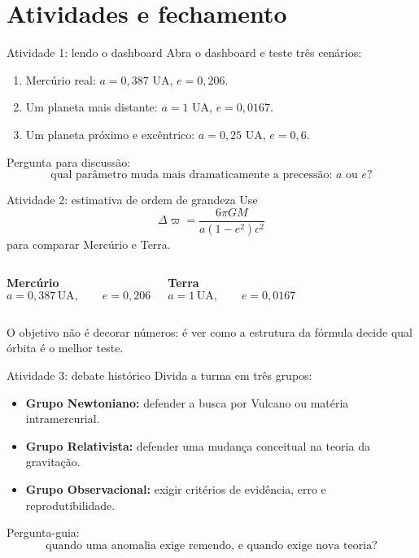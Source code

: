 \documentclass[aspectratio=169,10pt]{beamer}
\begin{document}
\section{Atividades e fechamento}

\begin{frame}{Atividade 1: lendo o dashboard}
  Abra o dashboard e teste três cenários:

  \vspace{0.25cm}
  \begin{enumerate}
    \item Mercúrio real: $a=0{,}387$ UA, $e=0{,}206$.
    \item Um planeta mais distante: $a=1$ UA, $e=0{,}0167$.
    \item Um planeta próximo e excêntrico: $a=0{,}25$ UA, $e=0{,}6$.
  \end{enumerate}

  \vspace{0.35cm}
  Pergunta para discussão:
  \[
    \text{qual parâmetro muda mais dramaticamente a precessão: }a\text{ ou }e?
  \]
\end{frame}

\begin{frame}{Atividade 2: estimativa de ordem de grandeza}
  Use
  \[
    \Delta\varpi =
    \frac{6\pi GM}{a(1-e^2)c^2}
  \]
  para comparar Mercúrio e Terra.

  \vspace{0.3cm}
  \begin{columns}[T,onlytextwidth]
    {\color{MercuryAccent}\textbf{Mercúrio}}
    \[
      a=0{,}387\,\text{UA},
      \qquad e=0{,}206
    \]

    {\color{MercuryAccent}\textbf{Terra}}
    \[
      a=1\,\text{UA},
      \qquad e=0{,}0167
    \]
  \end{columns}

  \vspace{0.35cm}
  O objetivo não é decorar números: é ver como a estrutura da fórmula decide qual órbita é o melhor teste.
\end{frame}

\begin{frame}{Atividade 3: debate histórico}
  Divida a turma em três grupos:

  \vspace{0.25cm}
  \begin{itemize}
    \item \textbf{Grupo Newtoniano:} defender a busca por Vulcano ou matéria intramercurial.
    \item \textbf{Grupo Relativista:} defender uma mudança conceitual na teoria da gravitação.
    \item \textbf{Grupo Observacional:} exigir critérios de evidência, erro e reprodutibilidade.
  \end{itemize}

  \vspace{0.35cm}
  Pergunta-guia:
  \[
    \text{quando uma anomalia exige remendo, e quando exige nova teoria?}
  \]
\end{frame}
\end{document}
